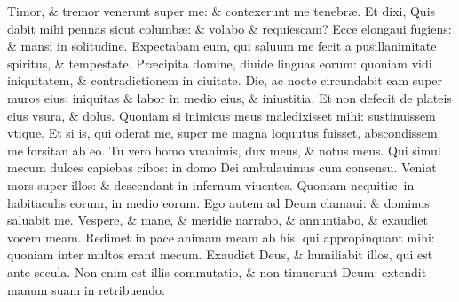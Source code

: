 \documentclass[a5paper,10pt]{book}
\def\ae{æ}
\begin{document}
\begin{multicols*}{2}
\newline \color{red} T\color{black}imor, \& tremor venerunt super me: \& contexerunt me tenebr\ae .
\newline \color{red} E\color{black}t dixi, Quis dabit mihi pennas sicut columb\ae : \& volabo \& requiescam?
\newline \color{red} E\color{black}cce elongaui fugiens: \& mansi in solitudine.
\newline \color{red} E\color{black}xpectabam eum, qui saluum me fecit a pusillanimitate spiritus, \& tempestate.
\newline \color{red} P\color{black}r\ae cipita domine, diuide linguas eorum: quoniam vidi iniquitatem, \& contradictionem in ciuitate.
\newline \color{red} D\color{black}ie, ac nocte circundabit eam super muros eius: iniquitas \& labor in medio eius, \& iniustitia.
\newline \color{red} E\color{black}t non defecit de plateis eius vsura, \& dolus.
\newline \color{red} Q\color{black}uoniam si inimicus meus maledixisset mihi: sustinuissem vtique.
\newline \color{red} E\color{black}t si is, qui oderat me, super me magna loquutus fuisset, abscondissem me forsitan ab eo.
\newline \color{red} T\color{black}u vero homo vnanimis, dux meus, \& notus meus.
\newline \color{red} Q\color{black}ui simul mecum dulces capiebas cibos: in domo Dei ambulauimus cum consensu.
\newline \color{red} V\color{black}eniat mors super illos: \& descendant in infernum viuentes.
\newline \color{red} Q\color{black}uoniam nequiti\ae \ in habitaculis eorum, in medio eorum.
\newline \color{red} E\color{black}go autem ad Deum clamaui: \& dominus saluabit me.
\newline \color{red} V\color{black}espere, \& mane, \& meridie narrabo, \& annuntiabo, \& exaudiet vocem meam.
\newline \color{red} R\color{black}edimet in pace animam meam ab his, qui appropinquant mihi: quoniam inter multos erant mecum.
\newline \color{red} E\color{black}xaudiet Deus, \& humiliabit illos, qui est ante secula.
\newline \color{red} N\color{black}on enim est illis commutatio, \& non timuerunt Deum: extendit manum suam in retribuendo.

\end{multicols*}
\end{document}
